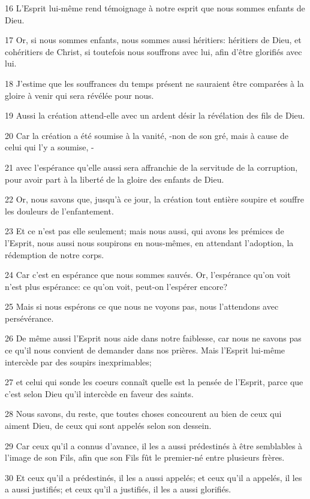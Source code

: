 \par 16 L'Esprit lui-même rend témoignage à notre esprit que nous sommes enfants de Dieu.
\par 17 Or, si nous sommes enfants, nous sommes aussi héritiers: héritiers de Dieu, et cohéritiers de Christ, si toutefois nous souffrons avec lui, afin d'être glorifiés avec lui.
\par 18 J'estime que les souffrances du temps présent ne sauraient être comparées à la gloire à venir qui sera révélée pour nous.
\par 19 Aussi la création attend-elle avec un ardent désir la révélation des fils de Dieu.
\par 20 Car la création a été soumise à la vanité, -non de son gré, mais à cause de celui qui l'y a soumise, -
\par 21 avec l'espérance qu'elle aussi sera affranchie de la servitude de la corruption, pour avoir part à la liberté de la gloire des enfants de Dieu.
\par 22 Or, nous savons que, jusqu'à ce jour, la création tout entière soupire et souffre les douleurs de l'enfantement.
\par 23 Et ce n'est pas elle seulement; mais nous aussi, qui avons les prémices de l'Esprit, nous aussi nous soupirons en nous-mêmes, en attendant l'adoption, la rédemption de notre corps.
\par 24 Car c'est en espérance que nous sommes sauvés. Or, l'espérance qu'on voit n'est plus espérance: ce qu'on voit, peut-on l'espérer encore?
\par 25 Mais si nous espérons ce que nous ne voyons pas, nous l'attendons avec persévérance.
\par 26 De même aussi l'Esprit nous aide dans notre faiblesse, car nous ne savons pas ce qu'il nous convient de demander dans nos prières. Mais l'Esprit lui-même intercède par des soupirs inexprimables;
\par 27 et celui qui sonde les coeurs connaît quelle est la pensée de l'Esprit, parce que c'est selon Dieu qu'il intercède en faveur des saints.
\par 28 Nous savons, du reste, que toutes choses concourent au bien de ceux qui aiment Dieu, de ceux qui sont appelés selon son dessein.
\par 29 Car ceux qu'il a connus d'avance, il les a aussi prédestinés à être semblables à l'image de son Fils, afin que son Fils fût le premier-né entre plusieurs frères.
\par 30 Et ceux qu'il a prédestinés, il les a aussi appelés; et ceux qu'il a appelés, il les a aussi justifiés; et ceux qu'il a justifiés, il les a aussi glorifiés.
